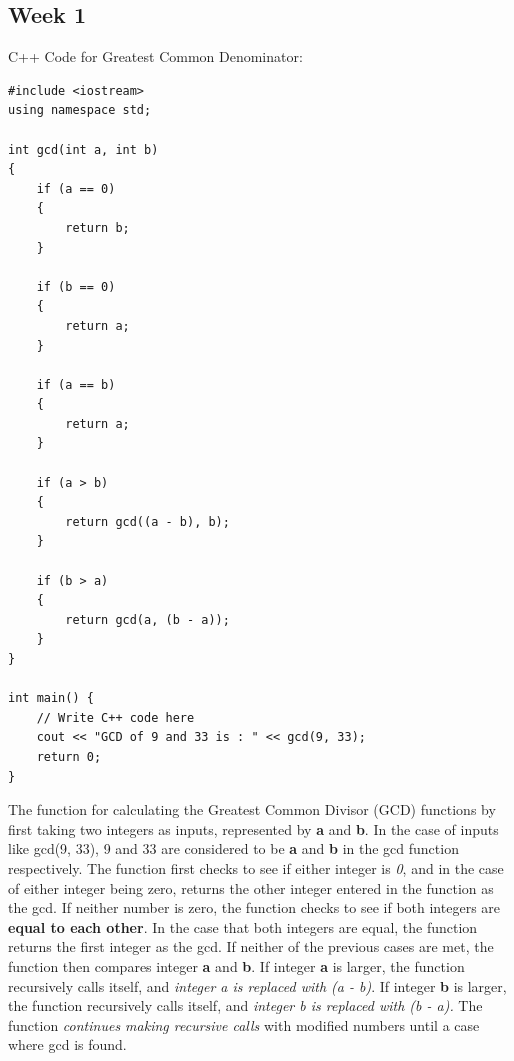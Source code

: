 \documentclass{article}
\theoremstyle{theorem}
\theoremstyle{definition}
\theoremstyle{remark}
\begin{document}
\subsection{Week 1}

C++ Code for Greatest Common Denominator:
\begin{lstlisting}
#include <iostream>
using namespace std;

int gcd(int a, int b)
{
    if (a == 0)
    {
        return b;
    }

    if (b == 0)
    {
        return a;
    }

    if (a == b)
    {
        return a;
    }

    if (a > b)
    {
        return gcd((a - b), b);
    }

    if (b > a)
    {
        return gcd(a, (b - a));
    }
}

int main() {
    // Write C++ code here
    cout << "GCD of 9 and 33 is : " << gcd(9, 33);
    return 0;
}
\end{lstlisting}

    The function for calculating the Greatest Common Divisor (GCD) functions by first taking two integers as inputs, represented by \textbf{a} and \textbf{b}. In the case of inputs like gcd(9, 33), 9 and 33 are considered to be \textbf{a} and \textbf{b} in the gcd function respectively. The function first checks to see if either integer is \textit{0}, and in the case of either integer being zero, returns the other integer entered in the function as the gcd. If neither number is zero, the function checks to see if both integers are \textbf{equal to each other}. In the case that both integers are equal, the function returns the first integer as the gcd. If neither of the previous cases are met, the function then compares integer \textbf{a} and \textbf{b}. If integer \textbf{a} is larger, the function recursively calls itself, and \textit{integer a is replaced with (a - b)}. If integer \textbf{b} is larger, the function recursively calls itself, and \textit{integer b is replaced with (b - a).} The function \textit{continues making recursive calls} with modified numbers until a case where gcd is found.
\end{document}
